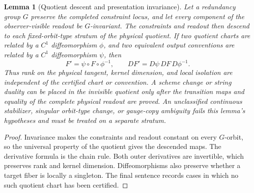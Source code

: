 \documentclass[11pt]{article}
\newtheorem{lemma}[theorem]{Lemma}
\theoremstyle{remark}
\theoremstyle{plain}
\begin{document}
\begin{lemma}[Quotient descent and presentation invariance]
Let a redundancy group \(G\) preserve the completed constraint locus, and let every component of
the observer-visible readout be \(G\)-invariant. The constraints and readout then descend to each
fixed-orbit-type stratum of the physical quotient. If two quotient charts are related by a
\(C^1\) diffeomorphism \(\phi\), and two equivalent output conventions are related by a \(C^1\)
diffeomorphism \(\psi\), then
\[
F'=\psi\circ F\circ\phi^{-1},
\qquad
DF'=D\psi\,DF\,D\phi^{-1}.
\]
Thus rank on the physical tangent, kernel dimension, and local isolation are independent of the
certified chart or convention. A scheme change or string duality can be placed in the invisible
quotient only after the transition maps and equality of the complete physical readout are proved.
An unclassified continuous stabilizer, singular orbit-type change, or gauge-copy ambiguity fails
this lemma's hypotheses and must be treated on a separate stratum.
\end{lemma}

\begin{proof}
Invariance makes the constraints and readout constant on every \(G\)-orbit, so the universal
property of the quotient gives the descended maps. The derivative formula is the chain rule.
Both outer derivatives are invertible, which preserves rank and kernel dimension. Diffeomorphisms
also preserve whether a target fiber is locally a singleton. The final sentence records cases in
which no such quotient chart has been certified.
\end{proof}
\end{document}
